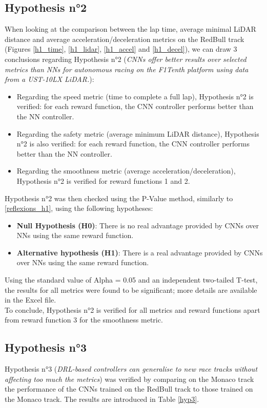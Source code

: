 \subsection{Hypothesis n°2}
When looking at the comparison between the lap time, average minimal LiDAR distance and average acceleration/deceleration metrics on the RedBull track (Figures \ref{h1_time}, \ref{h1_lidar}, \ref{h1_accel} and \ref{h1_decel}), we can draw 3 conclusions regarding Hypothesis n°2 (\textit{CNNs offer better results over selected metrics than NNs for autonomous racing on the F1Tenth platform using data from a UST-10LX LiDAR.}):
\begin{itemize}
	\item Regarding the speed metric (time to complete a full lap), Hypothesis n°2 is verified: for each reward function, the CNN controller performs better than the NN controller.
	\item Regarding the safety metric (average minimum LiDAR distance), Hypothesis n°2 is also verified: for each reward function, the CNN controller performs better than the NN controller.
	\item Regarding the smoothness metric (average acceleration/deceleration), Hypothesis n°2 is verified for reward functions 1 and 2.
\end{itemize}

Hypothesis n°2 was then checked using the P-Value method, similarly to \ref{reflexions_h1}, using the following hypotheses:

\begin{itemize}
	\item \textbf{Null Hypothesis (H0)}: There is no real advantage provided by CNNs over NNs using the same reward function.
	\item \textbf{Alternative hypothesis (H1)}: There is a real advantage provided by CNNs over NNs using the same reward function.
\end{itemize}

Using the standard value of Alpha = 0.05 and an independent two-tailed T-test, the results for all metrics were found to be significant; more details are available in the Excel file. \\
To conclude, Hypothesis n°2 is verified for all metrics and reward functions apart from reward function 3 for the smoothness metric.

\subsection{Hypothesis n°3}
Hypothesis n°3 (\textit{DRL-based controllers can generalise to new race tracks without affecting too much the metrics}) was verified by comparing on the Monaco track the performance of the CNNs trained on the RedBull track to those trained on the Monaco track. The results are introduced in Table \ref{hyp3}.

